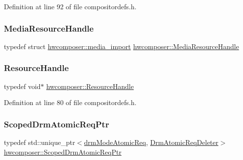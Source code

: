 Definition at line 92 of file compositordefs.\+h.

\mbox{\label{namespacehwcomposer_aa99e35835961ac7d6baa59a04131ff42}} 
\subsubsection{\texorpdfstring{Media\+Resource\+Handle}{MediaResourceHandle}}
{\footnotesize\ttfamily typedef struct \mbox{\hyperlink{structhwcomposer_1_1media__import}{hwcomposer\+::media\+\_\+import}}  \mbox{\hyperlink{namespacehwcomposer_aa99e35835961ac7d6baa59a04131ff42}{hwcomposer\+::\+Media\+Resource\+Handle}}}

\mbox{\label{namespacehwcomposer_a963c5a1d5902d2d05710dba19af35b48}} 
\subsubsection{\texorpdfstring{Resource\+Handle}{ResourceHandle}}
{\footnotesize\ttfamily typedef void$\ast$ \mbox{\hyperlink{namespacehwcomposer_a963c5a1d5902d2d05710dba19af35b48}{hwcomposer\+::\+Resource\+Handle}}}



Definition at line 80 of file compositordefs.\+h.

\mbox{\label{namespacehwcomposer_a1db01e0534b5b990ac7d35376c4b7e03}} 
\subsubsection{\texorpdfstring{Scoped\+Drm\+Atomic\+Req\+Ptr}{ScopedDrmAtomicReqPtr}}
{\footnotesize\ttfamily typedef std\+::unique\+\_\+ptr$<$\mbox{\hyperlink{drmscopedtypes_8h_a6d8c8b40283089c14de1005f7fb2ee0c}{drm\+Mode\+Atomic\+Req}}, \mbox{\hyperlink{structhwcomposer_1_1DrmAtomicReqDeleter}{Drm\+Atomic\+Req\+Deleter}}$>$ \mbox{\hyperlink{namespacehwcomposer_a1db01e0534b5b990ac7d35376c4b7e03}{hwcomposer\+::\+Scoped\+Drm\+Atomic\+Req\+Ptr}}}



